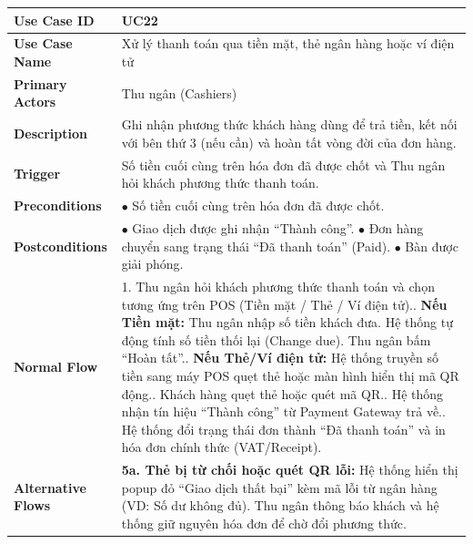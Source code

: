 \begin{longtable}{|L{3.5cm}|L{12.5cm}|}
\hline
\textbf{Use Case ID} & UC22 \\ \hline
\textbf{Use Case Name} & Xử lý thanh toán qua tiền mặt, thẻ ngân hàng hoặc ví điện tử \\ \hline
\textbf{Primary Actors} & Thu ngân (Cashiers) \\ \hline
\textbf{Description} & Ghi nhận phương thức khách hàng dùng để trả tiền, kết nối với bên thứ 3 (nếu cần) và hoàn tất vòng đời của đơn hàng. \\ \hline
\textbf{Trigger} & Số tiền cuối cùng trên hóa đơn đã được chốt và Thu ngân hỏi khách phương thức thanh toán. \\ \hline
\textbf{Preconditions} & $\bullet$ Số tiền cuối cùng trên hóa đơn đã được chốt. \\ \hline
\textbf{Postconditions} &
$\bullet$ Giao dịch được ghi nhận ``Thành công''.\newline
$\bullet$ Đơn hàng chuyển sang trạng thái ``Đã thanh toán'' (Paid).\newline
$\bullet$ Bàn được giải phóng. \\ \hline
\textbf{Normal Flow} &
1. Thu ngân hỏi khách phương thức thanh toán và chọn tương ứng trên POS (Tiền mặt / Thẻ / Ví điện tử).. \textbf{Nếu Tiền mặt:} Thu ngân nhập số tiền khách đưa. Hệ thống tự động tính số tiền thối lại (Change due). Thu ngân bấm ``Hoàn tất''.. \textbf{Nếu Thẻ/Ví điện tử:} Hệ thống truyền số tiền sang máy POS quẹt thẻ hoặc màn hình hiển thị mã QR động.. Khách hàng quẹt thẻ hoặc quét mã QR.. Hệ thống nhận tín hiệu ``Thành công'' từ Payment Gateway trả về.. Hệ thống đổi trạng thái đơn thành ``Đã thanh toán'' và in hóa đơn chính thức (VAT/Receipt). \\ \hline
\textbf{Alternative Flows} &
\textbf{5a. Thẻ bị từ chối hoặc quét QR lỗi:} Hệ thống hiển thị popup đỏ ``Giao dịch thất bại'' kèm mã lỗi từ ngân hàng (VD: Số dư không đủ). Thu ngân thông báo khách và hệ thống giữ nguyên hóa đơn để chờ đổi phương thức. \\ \hline
\end{longtable}
